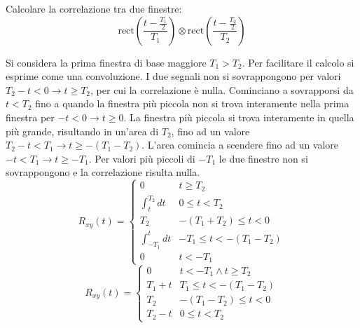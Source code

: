 \documentclass{article}
\begin{document}
Calcolare la correlazione tra due finestre:
\begin{equation*}
    \mbox{rect}\displaystyle\left(\frac{t-\frac{T_1}{2}}{T_1}\right)\otimes\mbox{rect}\left(\frac{t-\frac{T_2}{2}}{T_2}\right)
\end{equation*}

Si considera la prima finestra di base maggiore $T_1>T_2$. Per facilitare il calcolo si esprime come una convoluzione. I due segnali non si sovrappongono per valori 
$T_2-t<0\to t\geq T_2$, per cui la correlazione è nulla. Cominciano a sovrapporsi da $t<T_2$ fino a quando la finestra più piccola non si trova interamente nella prima 
finestra per $-t<0\to t\geq0$. La finestra più piccola si trova interamente in quella più grande, risultando in un'area di $T_2$, fino ad un valore 
$T_2-t<T_1\to t\geq -(T_1-T_2)$. L'area comincia a scendere fino ad un valore $-t<T_1\to t\geq -T_1$. Per valori più piccoli di $-T_1$ le due finestre non si sovrappongono e la 
correlazione risulta nulla.
\begin{equation*}
    R_{xy}(t)=\begin{cases}
        0&t\geq T_2\\
        \displaystyle\int_t^{T_2}dt& 0\leq t<T_2\\
        T_2& -(T_1+T_2)\leq t<0\\
        \displaystyle\int_{-T_1}^tdt& -T_1\leq t<-(T_1-T_2)\\
        0&t<-T_1
    \end{cases}
\end{equation*}
\begin{equation}
    R_{xy}(t)=\begin{cases}
        0& t<-T_1\land t\geq T_2\\
        T_1+t& T_1\leq t<-(T_1-T_2)\\
        T_2& -(T_1-T_2)\leq t<0\\
        T_2-t &  0\leq t<T_2
    \end{cases}
\end{equation}
\end{document}
